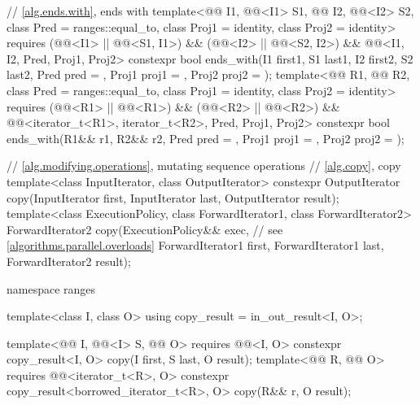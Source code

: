 \begin{codeblock}
{{    // \ref{alg.ends.with}, ends with
    template<@@ I1, @@<I1> S1, @@ I2, @@<I2> S2,
             class Pred = ranges::equal_to, class Proj1 = identity, class Proj2 = identity>
      requires (@@<I1> || @@<S1, I1>) &&
               (@@<I2> || @@<S2, I2>) &&
               @@<I1, I2, Pred, Proj1, Proj2>
      constexpr bool ends_with(I1 first1, S1 last1, I2 first2, S2 last2, Pred pred = {},
                               Proj1 proj1 = {}, Proj2 proj2 = {});
    template<@@ R1, @@ R2, class Pred = ranges::equal_to,
             class Proj1 = identity, class Proj2 = identity>
      requires (@@<R1> || @@<R1>) &&
               (@@<R2> || @@<R2>) &&
               @@<iterator_t<R1>, iterator_t<R2>, Pred, Proj1, Proj2>
      constexpr bool ends_with(R1&& r1, R2&& r2, Pred pred = {},
                               Proj1 proj1 = {}, Proj2 proj2 = {});
  }

  // \ref{alg.modifying.operations}, mutating sequence operations
  // \ref{alg.copy}, copy
  template<class InputIterator, class OutputIterator>
    constexpr OutputIterator copy(InputIterator first, InputIterator last,
                                  OutputIterator result);
  template<class ExecutionPolicy, class ForwardIterator1, class ForwardIterator2>
    ForwardIterator2 copy(ExecutionPolicy&& exec,               // see \ref{algorithms.parallel.overloads}
                          ForwardIterator1 first, ForwardIterator1 last,
                          ForwardIterator2 result);

  namespace ranges {
    template<class I, class O>
      using copy_result = in_out_result<I, O>;

    template<@@ I, @@<I> S, @@ O>
      requires @@<I, O>
      constexpr copy_result<I, O>
        copy(I first, S last, O result);
    template<@@ R, @@ O>
      requires @@<iterator_t<R>, O>
      constexpr copy_result<borrowed_iterator_t<R>, O>
        copy(R&& r, O result);
  }

}
\end{codeblock}
